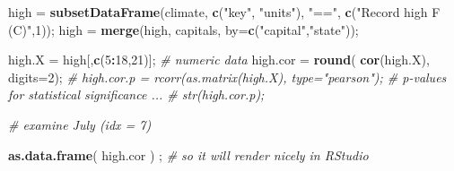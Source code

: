 \documentclass[
]{article}
\newenvironment{Shaded}{\begin{snugshade}}{\end{snugshade}}
\newcommand{\CommentTok}[1]{\textcolor[rgb]{0.56,0.35,0.01}{\textit{#1}}}
\newcommand{\DataTypeTok}[1]{\textcolor[rgb]{0.13,0.29,0.53}{#1}}
\newcommand{\DecValTok}[1]{\textcolor[rgb]{0.00,0.00,0.81}{#1}}
\newcommand{\KeywordTok}[1]{\textcolor[rgb]{0.13,0.29,0.53}{\textbf{#1}}}
\newcommand{\NormalTok}[1]{#1}
\newcommand{\OperatorTok}[1]{\textcolor[rgb]{0.81,0.36,0.00}{\textbf{#1}}}
\newcommand{\StringTok}[1]{\textcolor[rgb]{0.31,0.60,0.02}{#1}}
\begin{document}
\begin{Shaded}
\begin{Highlighting}[]
\NormalTok{high =}\StringTok{ }\KeywordTok{subsetDataFrame}\NormalTok{(climate, }\KeywordTok{c}\NormalTok{(}\StringTok{"key"}\NormalTok{, }\StringTok{"units"}\NormalTok{), }\StringTok{"=="}\NormalTok{, }\KeywordTok{c}\NormalTok{(}\StringTok{"Record high F (C)"}\NormalTok{,}\DecValTok{1}\NormalTok{));}
\NormalTok{high =}\StringTok{ }\KeywordTok{merge}\NormalTok{(high, capitals, }\DataTypeTok{by=}\KeywordTok{c}\NormalTok{(}\StringTok{"capital"}\NormalTok{,}\StringTok{"state"}\NormalTok{));}

\NormalTok{high.X =}\StringTok{ }\NormalTok{high[,}\KeywordTok{c}\NormalTok{(}\DecValTok{5}\OperatorTok{:}\DecValTok{18}\NormalTok{,}\DecValTok{21}\NormalTok{)]; }\CommentTok{\# numeric data}
\NormalTok{high.cor =}\StringTok{ }\KeywordTok{round}\NormalTok{( }\KeywordTok{cor}\NormalTok{(high.X), }\DataTypeTok{digits=}\DecValTok{2}\NormalTok{);}
\CommentTok{\# high.cor.p = rcorr(as.matrix(high.X), type="pearson");  \# p{-}values for statistical significance ... \# str(high.cor.p);}

\CommentTok{\# examine July (idx = 7)}

\KeywordTok{as.data.frame}\NormalTok{( high.cor ) ; }\CommentTok{\# so it will render nicely in RStudio}
\end{Highlighting}
\end{Shaded}
\end{document}

